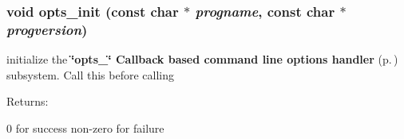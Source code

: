 \subsubsection{\setlength{\rightskip}{0pt plus 5cm}void opts\_\-init (const char $\ast$ {\em progname}, const char $\ast$ {\em progversion})}\label{opts__utils_8h_a10}


initialize the {\bf \char`\"{}opts\_\-\char`\"{} Callback based command line options handler} {\rm (p.\,\pageref{group__opts})} subsystem. Call this before calling

\begin{Desc}
\item[Returns: ]\par
0 for success non-zero for failure \end{Desc}
